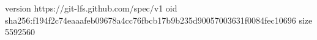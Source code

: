 version https://git-lfs.github.com/spec/v1
oid sha256:f194f2c74eaaafeb09678a4cc76fbcb17b9b235d90057003631f0084fec10696
size 5592560
